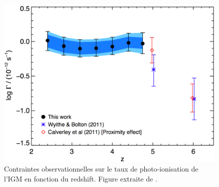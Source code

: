 
\begin{figure}
        \includegraphics[width=.95\linewidth]{img/01/photon_obs.pdf} 
        \caption[Taux de photo-ionisation ]{Contraintes observationnelles sur le taux de photo-ionisation de l'\ac{IGM} en fonction du redshift. 
        Figure extraite de \cite{2013MNRAS.436.1023B}.
 		\label{fig:photoionisationrate}}
\end{figure}



\clearpage


